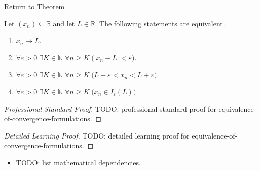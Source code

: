 \newpage
{}
\label{prf:equivalence-of-convergence-formulations}

\begin{remark*}[Return]
\hyperref[thm:equivalence-of-convergence-formulations]{Return to Theorem}
\end{remark*}

\begin{theorem*}
Let $(x_n) \subseteq \mathbb{R}$ and let $L \in \mathbb{R}$. The following
statements are equivalent.
\begin{enumerate}[label=\textup{(\alph*)}]
    \item $x_n \to L$.
    \item $\forall \varepsilon > 0 \;\exists K \in \mathbb{N} \;\forall n \ge K
          \;\bigl(|x_n - L| < \varepsilon\bigr)$.
    \item $\forall \varepsilon > 0 \;\exists K \in \mathbb{N} \;\forall n \ge K
          \;\bigl(L - \varepsilon < x_n < L + \varepsilon\bigr)$.
    \item $\forall \varepsilon > 0 \;\exists K \in \mathbb{N} \;\forall n \ge K
          \;\bigl(x_n \in I_\varepsilon(L)\bigr)$.
\end{enumerate}

\smallskip
\noindent
\end{theorem*}

\begin{proof}[Professional Standard Proof]
\LRAProofBodyStart
TODO: professional standard proof for equivalence-of-convergence-formulations.
\end{proof}

\begin{proof}[Detailed Learning Proof]
\LRAProofBodyStart
TODO: detailed learning proof for equivalence-of-convergence-formulations.
\end{proof}

\begin{remark*}
\end{remark*}

\begin{dependencies}
\begin{itemize}
  \item TODO: list mathematical dependencies.
\end{itemize}
\end{dependencies}

\clearpage
